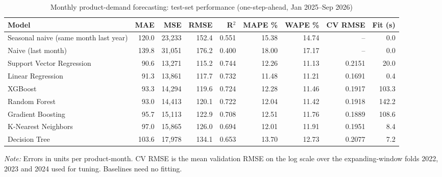 \begin{table}[htbp]
\centering
\footnotesize
\caption{Monthly product-demand forecasting: test-set performance (one-step-ahead, Jan 2025--Sep 2026)}
\label{tab:forecast}
\begin{adjustbox}{max width=\linewidth}
\begin{tabular}{lrrrrrrrr}
\toprule
\textbf{Model} & \textbf{MAE} & \textbf{MSE} & \textbf{RMSE} & \textbf{R$^2$} & \textbf{MAPE \%} & \textbf{WAPE \%} & \textbf{CV RMSE} & \textbf{Fit (s)} \\
\midrule
Seasonal naive (same month last year) & 120.0 & 23,233 & 152.4 & 0.551 & 15.38 & 14.74 & -- & 0.0 \\
Naive (last month) & 139.8 & 31,051 & 176.2 & 0.400 & 18.00 & 17.17 & -- & 0.0 \\
Support Vector Regression & 90.6 & 13,271 & 115.2 & 0.744 & 12.26 & 11.13 & 0.2151 & 20.0 \\
Linear Regression & 91.3 & 13,861 & 117.7 & 0.732 & 11.48 & 11.21 & 0.1691 & 0.4 \\
XGBoost & 93.3 & 14,294 & 119.6 & 0.724 & 12.28 & 11.46 & 0.1917 & 103.3 \\
Random Forest & 93.0 & 14,413 & 120.1 & 0.722 & 12.04 & 11.42 & 0.1918 & 142.2 \\
Gradient Boosting & 95.7 & 15,113 & 122.9 & 0.708 & 12.51 & 11.76 & 0.1889 & 108.6 \\
K-Nearest Neighbors & 97.0 & 15,865 & 126.0 & 0.694 & 12.01 & 11.91 & 0.1951 & 8.4 \\
Decision Tree & 103.6 & 17,978 & 134.1 & 0.653 & 13.70 & 12.73 & 0.2077 & 7.2 \\
\bottomrule
\end{tabular}
\end{adjustbox}
\par\smallskip\parbox{0.92\linewidth}{\footnotesize\emph{Note:} Errors in units per product-month. CV RMSE is the mean validation RMSE on the log scale over the expanding-window folds 2022, 2023 and 2024 used for tuning. Baselines need no fitting.}
\end{table}